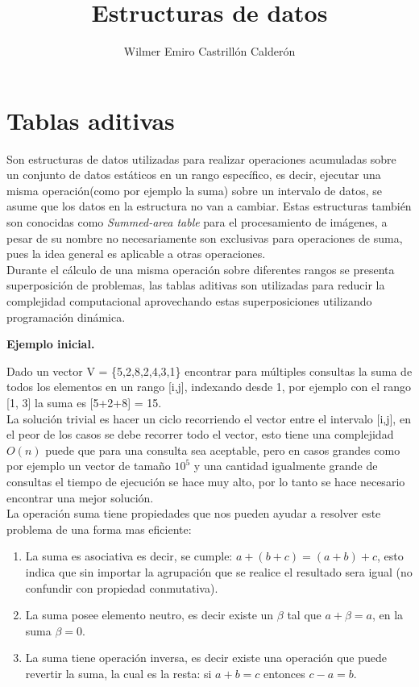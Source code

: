 \documentclass[12pt, a4paper]{article}
\title{\textbf{Estructuras de datos}}
\author{Wilmer Emiro Castrillón Calderón}
\newcommand{\subtitulo}[1]{\begin{center}\textbf{#1}\end{center}}
\begin{document}
	\maketitle
	
	
	\section{Tablas aditivas}
	Son estructuras de datos utilizadas para realizar operaciones acumuladas sobre un conjunto de datos estáticos 
	en un rango específico, es decir, ejecutar una misma operación(como por ejemplo la suma) sobre un intervalo 
	de datos, se asume que los datos en la estructura no van a cambiar. Estas estructuras también son conocidas como 
	\textit{Summed-area table} para el procesamiento de imágenes, a pesar de su nombre no necesariamente son 
	exclusivas para operaciones de suma, pues la idea general es aplicable a otras operaciones.\\
	
	Durante el cálculo de una misma operación sobre diferentes rangos se presenta superposición de problemas, las 
	tablas aditivas son utilizadas para reducir la complejidad computacional aprovechando estas superposiciones
	utilizando programación dinámica.
	
	\subtitulo{Ejemplo inicial.}
	
	Dado un vector V = \{5,2,8,2,4,3,1\} encontrar para múltiples consultas la suma de todos los elementos en un rango
	[i,j], indexando desde 1, por ejemplo con el rango [1, 3] la suma es [5+2+8] = 15.\\
	
	La solución trivial es hacer un ciclo recorriendo el vector entre el intervalo [i,j], en el peor de los casos se
	debe recorrer todo el vector, esto tiene una complejidad $O(n)$ puede que para una consulta sea aceptable, pero
	en casos grandes como por ejemplo un vector de tamaño $10^{5}$ y una cantidad igualmente grande de consultas el
	tiempo de ejecución se hace muy alto, por lo tanto se hace necesario encontrar una mejor solución.\\
	
	La operación suma tiene propiedades que nos pueden ayudar a resolver este problema de una forma mas eficiente:
	\begin{enumerate}[1.]
		\item La suma es asociativa es decir, se cumple: $a+(b+c)=(a+b)+c$, esto indica que sin importar 
			la agrupación que se realice el resultado sera igual (no confundir con propiedad conmutativa).
		\item La suma posee elemento neutro, es decir existe un $\beta$ tal que $a + \beta = a$, en la suma 
			$\beta = 0$.
		\item La suma tiene operación inversa, es decir existe una operación que puede revertir la suma, la cual 
			es la resta: si $a+b=c$ entonces $c-a=b$.
	\end{enumerate}
	
\end{document}

